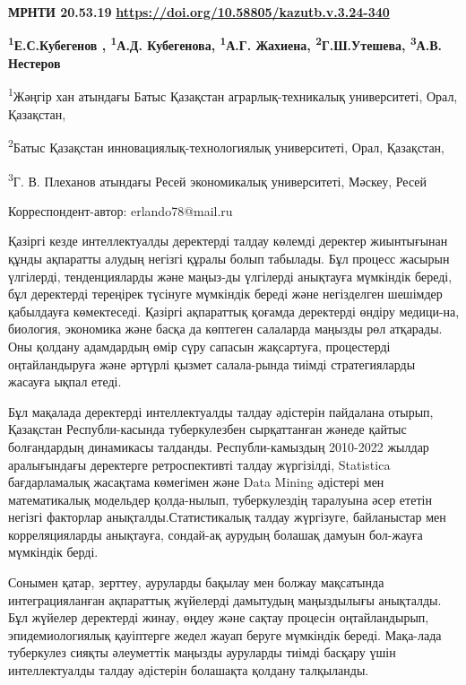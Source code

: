 \newpage
{\bfseries МРНТИ 20.53.19}
\hfill {\bfseries \href{https://doi.org/10.58805/kazutb.v.3.24-340}{https://doi.org/10.58805/kazutb.v.3.24-340}}

\begin{center}

{\bfseries \textsuperscript{1}Е.С.Кубегенов \envelope,
\textsuperscript{1}А.Д. Кубегенова, \textsuperscript{1}А.Г. Жахиена,
\textsuperscript{2}Г.Ш.Утешева, \textsuperscript{3}А.В. Нестеров}

\textsuperscript{1}Жәңгір хан атындағы Батыс Қазақстан
аграрлық-техникалық университеті, Орал, Қазақстан,

\textsuperscript{2}Батыс Қазақстан инновациялық-технологиялық
университеті, Орал, Қазақстан,

\textsuperscript{3}Г. В. Плеханов атындағы Ресей экономикалық
университеті, Мәскеу, Ресей
\end{center}
\envelope Корреспондент-автор: erlando78@mail.ru \vspace{0.5cm}

Қазіргі кезде интеллектуалды деректерді талдау көлемді деректер
жиынтығынан құнды ақпаратты алудың негізгі құралы болып табылады. Бұл
процесс жасырын үлгілерді, тенденцияларды және маңыз-ды үлгілерді
анықтауға мүмкіндік береді, бұл деректерді тереңірек түсінуге мүмкіндік
береді және негізделген шешімдер қабылдауға көмектеседі. Қазіргі
ақпараттық қоғамда деректерді өндіру медици-на, биология, экономика және
басқа да көптеген салаларда маңызды рөл атқарады. Оны қолдану адамдардың
өмір сүру сапасын жақсартуға, процестерді оңтайландыруға және әртүрлі
қызмет салала-рында тиімді стратегияларды жасауға ықпал етеді.

Бұл мақалада деректерді интеллектуалды талдау әдістерін пайдалана
отырып, Қазақстан Республи-касында туберкулезбен сырқаттанған жәнеде
қайтыс болғандардың динамикасы талданды. Республи-камыздың 2010-2022
жылдар аралығындағы деректерге ретроспективті талдау жүргізілді,
Statistica бағдарламалық жасақтама көмегімен және Data Mining әдістері
мен математикалық модельдер қолда-нылып, туберкулездің таралуына әсер
ететін негізгі факторлар анықталды.Статистикалық талдау жүргізуге,
байланыстар мен корреляцияларды анықтауға, сондай-ақ аурудың болашақ
дамуын бол-жауға мүмкіндік берді.

Сонымен қатар, зерттеу, ауруларды бақылау мен болжау мақсатында
интеграцияланған ақпараттық жүйелерді дамытудың маңыздылығы анықталды.
Бұл жүйелер деректерді жинау, өңдеу және сақтау процесін оңтайландырып,
эпидемиологиялық қауіптерге жедел жауап беруге мүмкіндік береді.
Мақа-лада туберкулез сияқты әлеуметтік маңызды ауруларды тиімді басқару
үшін интеллектуалды талдау әдістерін болашақта қолдану талқыланды.

